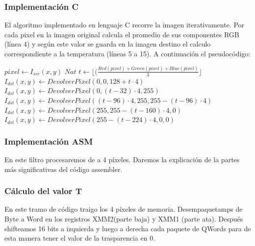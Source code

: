 \hfill
\subsubsection{Implementación C}

El algoritmo implementado en lenguaje C recorre la imagen iterativamente. Por cada pixel en la imagen original calcula el promedio de sus componentes RGB (línea 4) y según este valor se guarda en la imagen destino el calculo correspondiente a la temperatura (líneas 5 a 15). A continuación el pseudocódigo:
	
\begin{algorithm}[H]
  \begin{algorithmic}[1]
				\STATE $ pixel \gets I_{src}(x,y)$
				\STATE $Nat $ $ t \gets \lfloor(\frac{Red(pixel)+Green(pixel)+Blue(pixel)}{3}\rfloor$
					\STATE $I_{dst}(x,y) \gets DevolverPixel(0,0,128+t \cdot 4)$
					\STATE $I_{dst}(x,y) \gets DevolverPixel(0,(t-32) \cdot 4,255)$
					\STATE $I_{dst}(x,y) \gets DevolverPixel((t-96) \cdot 4,255, 255-(t-96) \cdot 4)$
					\STATE $I_{dst}(x,y) \gets DevolverPixel(255, 255-(t-160) \cdot 4, 0)$
				\ELSE		
					\STATE $I_{dst}(x,y) \gets DevolverPixel(255-(t-224) \cdot 4, 0, 0)$
				\ENDIF	
			\ENDFOR
		 \ENDFOR
  \end{algorithmic}
  \caption{$temperature (I_{src}, I_{dst})$}
  \label{alg:temperature}
\end{algorithm}	

\subsubsection{Implementación ASM}
En este filtro procesaremos de a 4 píxeles. Daremos la explicación de la partes más significativas del código assembler.

\subsubsection*{Cálculo del valor T}

En este tramo de código traigo los 4 píxeles de memoria. Desempaquetamps de Byte a Word en los registros XMM2(parte baja) y XMM1 (parte ata). Después shifteamos 16 bits a izquierda y luego a derecha cada paquete de QWords para de esta manera tener el valor de la trasparencia en 0.

